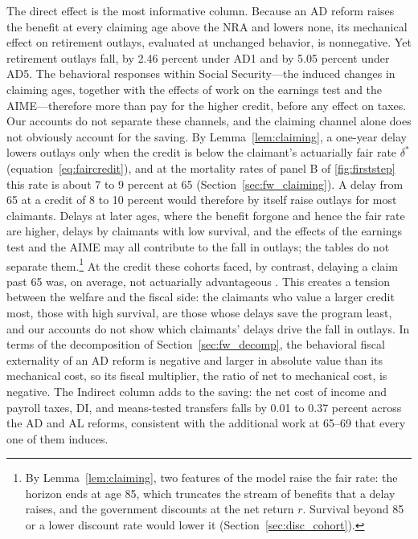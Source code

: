 The direct effect is the most informative column. Because an AD reform raises the benefit at every claiming age above the NRA and lowers none, its mechanical effect on retirement outlays, evaluated at unchanged behavior, is nonnegative. Yet retirement outlays fall, by 2.46 percent under AD1 and by 5.05 percent under AD5. The behavioral responses within Social Security---the induced changes in claiming ages, together with the effects of work on the earnings test and the AIME---therefore more than pay for the higher credit, before any effect on taxes. Our accounts do not separate these channels, and the claiming channel alone does not obviously account for the saving. By Lemma~\ref{lem:claiming}, a one-year delay lowers outlays only when the credit is below the claimant's actuarially fair rate $\delta^{*}$ (equation~\eqref{eq:faircredit}), and at the mortality rates of panel B of \autoref{fig:firststep} this rate is about 7 to 9 percent at 65 (Section~\ref{sec:fw_claiming}). A delay from 65 at a credit of 8 to 10 percent would therefore by itself raise outlays for most claimants. Delays at later ages, where the benefit forgone and hence the fair rate are higher, delays by claimants with low survival, and the effects of the earnings test and the AIME may all contribute to the fall in outlays; the tables do not separate them.\footnote{By Lemma~\ref{lem:claiming}, two features of the model raise the fair rate: the horizon ends at age 85, which truncates the stream of benefits that a delay raises, and the government discounts at the net return $r$. Survival beyond 85 or a lower discount rate would lower it (Section~\ref{sec:disc_cohort}).} At the credit these cohorts faced, by contrast, delaying a claim past 65 was, on average, not actuarially advantageous \citep{Coile2002delays}. This creates a tension between the welfare and the fiscal side: the claimants who value a larger credit most, those with high survival, are those whose delays save the program least, and our accounts do not show which claimants' delays drive the fall in outlays. In terms of the decomposition of Section~\ref{sec:fw_decomp}, the behavioral fiscal externality of an AD reform is negative and larger in absolute value than its mechanical cost, so its fiscal multiplier, the ratio of net to mechanical cost, is negative. The Indirect column adds to the saving: the net cost of income and payroll taxes, DI, and means-tested transfers falls by 0.01 to 0.37 percent across the AD and AL reforms, consistent with the additional work at 65--69 that every one of them induces.

